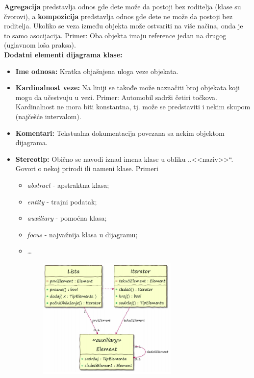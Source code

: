 \documentclass[a4paper]{article}
\begin{document}
  \textbf{Agregacija} predstavlja odnos gde dete može da postoji bez roditelja (klase su čvorovi), 
  a \textbf{kompozicija} predstavlja odnos gde dete ne može da postoji bez roditelja.
  \indent Ukoliko se veza između objekta može ostvariti na više načina, onda je to
  samo asocijacija. Primer: Oba objekta imaju reference jedan na drugog 
  (uglavnom loša praksa).\\
  \noindent \textbf{Dodatni elementi dijagrama klase:}
  \begin{itemize}
    \item \textbf{Ime odnosa:} Kratka objašnjena uloga veze objekata.
    \item \textbf{Kardinalnost veze:} Na liniji se takođe može naznačiti broj objekata koji
          mogu da učestvuju u vezi.
          Primer: Automobil sadrži četiri točkova. Kardinalnost ne mora 
          biti konstantna, tj. može se predstaviti i nekim skupom (najčešće intervalom).
    \item \textbf{Komentari:} Tekstualna dokumentacija povezana sa nekim objektom dijagrama.
    \item \textbf{Stereotip:} Obično se navodi iznad imena klase u obliku ,,<<naziv>>``. 
          Govori o nekoj prirodi ili nameni klase. Primeri
          \begin{itemize}
            \item \textit{abstract} - apstraktna klasa;
            \item \textit{entity} - trajni podatak;
            \item \textit{auxiliary} - pomoćna klasa;
            \item \textit{focus} - najvažnija klasa u dijagramu;
            \item \dots
          \end{itemize}
  \end{itemize}
  \begin{figure}[H]
    \begin{center}
        \includegraphics[width=90mm,height=60mm]{Slike/klasa_lista.png}
    \end{center}
  \end{figure} 
\end{document}
